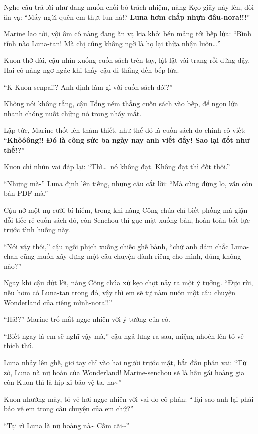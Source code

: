 \documentclass[../main.tex]{subfiles}
\begin{document}
Nghe câu trả lời như đang muốn chối bỏ trách nhiệm, nàng Kẹo giãy nảy lên, đòi ăn vạ: ``Mấy ngừi quên em thựt lun hả!? \textbf{Luna hơm chấp nhựn đâu-nora!!!}''

Marine lao tới, vội ôm cô nàng đang ăn vạ kia khỏi bén mảng tới bếp lửa: ``Bình tĩnh nào Luna-tan! Mà chị cũng không ngờ là họ lại thừa nhận luôn\dots''

Kuon thở dài, cậu nhìn xuống cuốn sách trên tay, lật lật vài trang rồi đứng dậy. Hai cô nàng ngơ ngác khi thấy cậu đi thẳng đến bếp lửa.

``K-Kuon-senpai!? Anh định làm gì với cuốn sách đó!?''

Không nói không rằng, cậu Tổng ném thẳng cuốn sách vào bếp, để ngọn lửa nhanh chóng nuốt chửng nó trong nháy mắt.

Lập tức, Marine thốt lên thảm thiết, như thể đó là cuốn sách do chính cô viết: ``\textbf{Khôôông!! Đó là công sức ba ngày nay anh viết đấy! Sao lại đốt như thế!?}''

Kuon chỉ nhún vai đáp lại: ``Thì\dots\ nó không đạt. Không đạt thì đốt thôi.''

``Nhưng mà-'' Luna định lên tiếng, nhưng cậu cắt lời: ``Mà cũng đừng lo, vẫn còn bản PDF mà.''

Cậu nở một nụ cười bí hiểm, trong khi nàng Công chúa chỉ biết phồng má giận dỗi tiếc rẻ cuốn sách đó, còn Senchou thì gục mặt xuống bàn, hoàn toàn bất lực trước tình huống này.

``Nói vậy thôi,'' cậu ngồi phịch xuống chiếc ghế bành, ``chứ anh dám chắc Luna-chan cũng muốn xây dựng một câu chuyện dành riêng cho mình, đúng không nào?''

Ngay khi cậu dứt lời, nàng Công chúa xứ kẹo chợt nảy ra một ý tưởng. ``Đực rùi, nếu hơm có Luna-tan trong đó, vậy thì em sẽ tự nàm nuôn một câu chuyện Wonderland của riêng mình-nora!!''

``Hả!?'' Marine trố mắt ngạc nhiên với ý tưởng của cô.

``Biết ngay là em sẽ nghĩ vậy mà,'' cậu ngả lưng ra sau, miệng nhoẻn lên tỏ vẻ thích thú.

Luna nhảy lên ghế, giơ tay chỉ vào hai người trước mặt, bắt đầu phân vai: ``Từ zờ, Luna nà nữ hoàn của Wonderland! Marine-senchou sẽ là hầu gái hoàng gia còn Kuon thì là hịp xĩ bảo vệ ta, na\~{}''

Kuon nhướng mày, tỏ vẻ hơi ngạc nhiên với vai do cô phân: ``Tại sao anh lại phải bảo vệ em trong câu chuyện của em chứ?''

``Tại zì Luna là nữ hoàng nà\~{} Cấm cãi\~{}''
\end{document}
